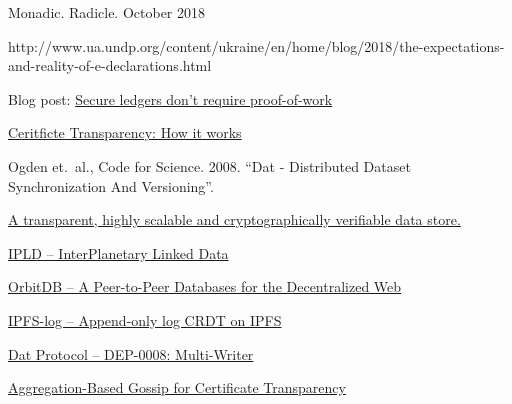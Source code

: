 \documentclass[a4paper, oneside, 10pt]{amsart}
\begin{document}
\begin{thebibliography}{9}

 Monadic. Radicle. October 2018

  http://www.ua.undp.org/content/ukraine/en/home/blog/2018/the-expectations-and-reality-of-e-declarations.html

 Blog post:
  \href{https://pfrazee.github.io/blog/secure-ledgers-dont-require-proof-of-work}{Secure
    ledgers don't require proof-of-work}

  \href{https://www.certificate-transparency.org/how-ct-works}{Ceritficte Transparency: How it works}

  Ogden et.~al., Code for Science. 2008. ``Dat - Distributed Dataset Synchronization And Versioning''.

  \href{https://github.com/google/trillian}{A transparent, highly scalable and cryptographically verifiable data store.}

  \href{https://github.com/ipld/ipld}{IPLD -- InterPlanetary Linked Data}

  \href{https://github.com/orbitdb/orbit-db}{OrbitDB -- A Peer-to-Peer Databases for the Decentralized Web}

  \href{https://github.com/orbitdb/ipfs-log}{IPFS-log -- Append-only log CRDT on IPFS}

  \href{https://www.datprotocol.com/deps/0008-multiwriter/}{Dat Protocol -- DEP-0008: Multi-Writer}

  \href{https://arxiv.org/pdf/1806.08817.pdf}{Aggregation-Based Gossip for Certificate Transparency}
  
\end{thebibliography}
\end{document}
